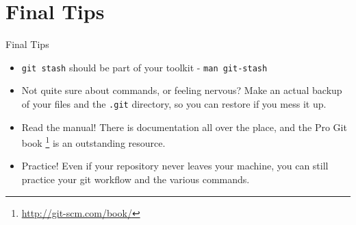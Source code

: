 \documentclass{beamer}
\begin{document}
\section{Final Tips}
\begin{frame}{Final Tips}
\begin{itemize}
  \item \texttt{git stash} should be part of your toolkit -
        \texttt{man git-stash}
  \item Not quite sure about commands, or feeling nervous? Make an actual backup
        of your files and the \texttt{.git} directory, so you can restore if you
        mess it up.
  \item Read the manual! There is documentation all over the place, and the Pro
        Git book
        \footnote{\href{http://git-scm.com/book/}{http://git-scm.com/book/}}
        is an outstanding resource.
  \item Practice! Even if your repository never leaves your machine, you can
        still practice your git workflow and the various commands.
\end{itemize}


\end{frame}
\end{document}

